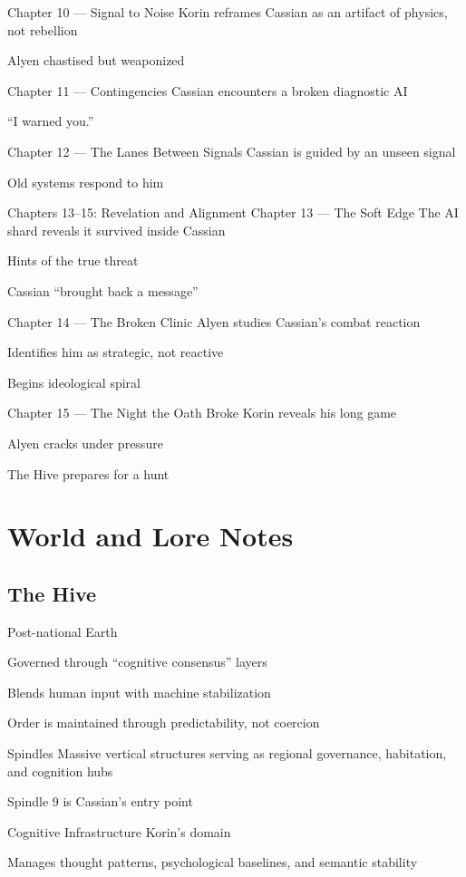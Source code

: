 \documentclass[12pt,oneside]{book}
\begin{document}
Chapter 10 — Signal to Noise
Korin reframes Cassian as an artifact of physics, not rebellion


Alyen chastised but weaponized


Chapter 11 — Contingencies
Cassian encounters a broken diagnostic AI


“I warned you.”


Chapter 12 — The Lanes Between Signals
Cassian is guided by an unseen signal


Old systems respond to him



Chapters 13–15: Revelation and Alignment
Chapter 13 — The Soft Edge
The AI shard reveals it survived inside Cassian


Hints of the true threat


Cassian “brought back a message”


Chapter 14 — The Broken Clinic
Alyen studies Cassian’s combat reaction


Identifies him as strategic, not reactive


Begins ideological spiral


Chapter 15 — The Night the Oath Broke
Korin reveals his long game


Alyen cracks under pressure


The Hive prepares for a hunt



\chapter{World and Lore Notes}

\section{The Hive}
Post-national Earth


Governed through “cognitive consensus” layers


Blends human input with machine stabilization


Order is maintained through predictability, not coercion

Spindles
Massive vertical structures serving as regional governance, habitation, and cognition hubs


Spindle 9 is Cassian’s entry point


Cognitive Infrastructure
Korin’s domain


Manages thought patterns, psychological baselines, and semantic stability
\end{document}
